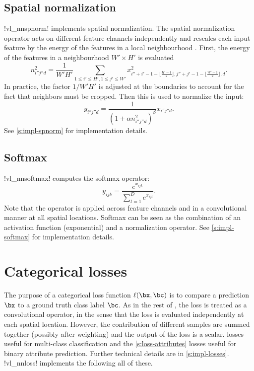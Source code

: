 \subsection{Spatial normalization}\label{s:spnorm}

!vl_nnspnorm! implements spatial normalization. The spatial normalization operator acts on different feature channels independently and rescales each input feature by the energy of the features in a local neighbourhood . First, the energy of the features in a neighbourhood $W'\times H'$ is evaluated
\[
n_{i''j''d}^2 = \frac{1}{W'H'}
\sum_{1\leq i' \leq H', 1 \leq j' \leq W'} x^2_{
i''+i'-1-\lfloor \frac{H'-1}{2}\rfloor,
j''+j'-1-\lfloor \frac{W'-1}{2}\rfloor,
d}.
\]
In practice, the factor $1/W'H'$ is adjusted at the boundaries to account for the fact that neighbors must be cropped. Then this is used to normalize the input:
\[
y_{i''j''d} = \frac{1}{(1 + \alpha n_{i''j''d}^2)^\beta} x_{i''j''d}.
\]
See \cref{s:impl-spnorm} for implementation details.

\subsection{Softmax}\label{s:softmax}

!vl_nnsoftmax! computes the softmax operator:
\[
 y_{ijk} = \frac{e^{x_{ijk}}}{\sum_{t=1}^D e^{x_{ijt}}}.
\]
Note that the operator is applied across feature channels and in a convolutional manner at all spatial locations. Softmax can be seen as the combination of an activation function (exponential) and a normalization operator. See \cref{s:impl-softmax} for implementation details.

\section{Categorical losses}\label{s:losses}

The purpose of a categorical loss function $\ell(\bx,\bc)$ is to compare a prediction $\bx$ to a ground truth class label $\bc$. As in the rest of \matconvnet, the loss is treated as a convolutional operator, in the sense that the loss is evaluated independently at each spatial location. However, the contribution of different samples are summed together (possibly after weighting) and the output of the loss is a scalar.  losses useful for multi-class classification and the \cref{s:loss-attributes} losses useful for binary attribute prediction. Further technical details are in \cref{s:impl-losses}. !vl_nnloss! implements the following all of these.

